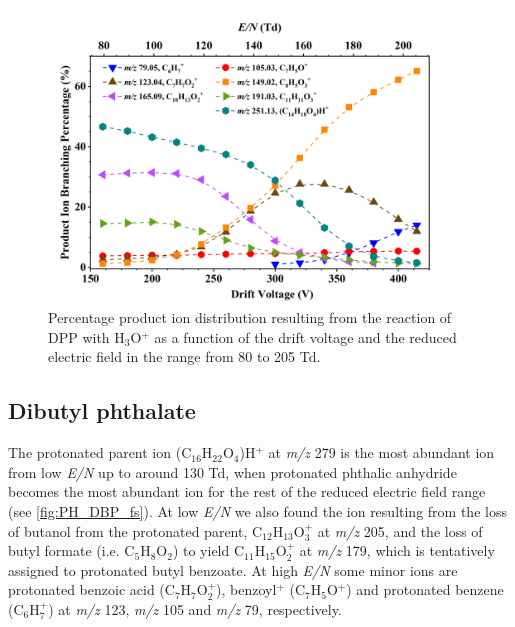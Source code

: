     \begin{figure}[htb]%
    \centering
    \includegraphics[height=0.4\textheight]{pics/DPP-BR.png}
    \caption{Percentage product ion distribution resulting from the reaction of DPP with H$_3$O$^+$ as a function of the drift voltage and the reduced electric field in the range from 80 to 205 Td.}
    \label{fig:PH_DPP_fs}
    \end{figure}
%




\subsection{Dibutyl phthalate}

%
The protonated parent ion  (C$_{16}$H$_{22}$O$_4$)H$^+$ at \textit{m/z} 279 is the most abundant ion from low \textit{E/N} up to around 130 Td, when protonated phthalic anhydride becomes the most abundant ion for the rest of the reduced electric field range (see \autoref{fig:PH_DBP_fs}).
%
At low \textit{E/N} we also found the  ion resulting from the loss of butanol from the protonated parent, C$_{12}$H$_{13}$O$_3^+$ at \textit{m/z} 205,  and the loss of butyl formate (i.e. C$_{5}$H$_{8}$O$_2$) to yield C$_{11}$H$_{15}$O$_2^+$ at \textit{m/z} 179, which is tentatively assigned to protonated butyl benzoate.
%
At high \textit{E/N} some minor ions are protonated benzoic acid (C$_{7}$H$_{7}$O$_2^+$), benzoyl$^+$ (C$_7$H$_{5}$O$^+$) and protonated benzene (C$_6$H$_{7}^+$) at \textit{m/z} 123, \textit{m/z} 105 and \textit{m/z} 79, respectively.


